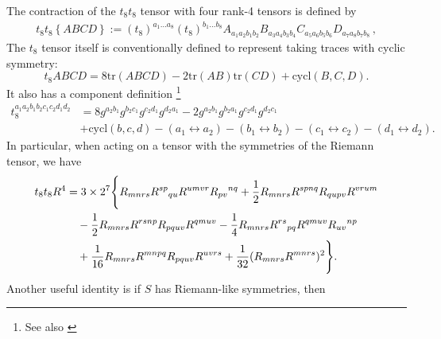 The contraction of the $t_8 t_8$ tensor with four rank-4 tensors is defined by
\begin{align}
	t_8 t_8 \left\{ ABCD \right\} := (t_8)^{a_1 \ldots a_8} (t_8)^{b_1 \ldots b_8} A_{a_1 a_2 b_1 b_2} B_{a_3 a_4 b_3 b_4} C_{a_5 a_6 b_5 b_6} D_{a_7 a_8 b_7 b_8} \,,
\end{align}
The $t_8$ tensor itself is conventionally \cite{Aggarwal:2025lxf,Liu:2025uqu} defined to represent taking traces with cyclic symmetry:
\begin{equation}
t_8 ABCD = 8 \text{tr} (ABCD) - 2 \text{tr} (AB) \text{tr} (CD) + \text{cycl}(B,C,D).
\end{equation}
It also has a component definition \footnote{See also \cite{Minasian:2015bxa}}
\begin{equation}
\begin{aligned}
t_8^{a_1 a_2 b_1 b_2 c_1 c_2 d_1 d_2}
&= 8 g^{a_2 b_1} g^{b_2 c_1} g^{c_2 d_1} g^{d_2 a_1}
- 2 g^{a_2 b_1} g^{b_2 a_1} g^{c_2 d_1} g^{d_2 c_1}\\
&+ \text{cycl}(b,c,d)
- (a_1 \leftrightarrow a_2)
- (b_1 \leftrightarrow b_2)
- (c_1 \leftrightarrow c_2)
- (d_1 \leftrightarrow d_2).
\end{aligned}
\end{equation}
In particular, when acting on a tensor with the symmetries of the Riemann tensor, we have
\begin{equation}
\begin{aligned}
t_8 t_8 R^4 &= 3 \times 2^7 \Biggl\{
R_{mnrs} R^{sp}{}_{qu} R^{umvr} R_{pv}{}^{nq}
+ \frac{1}{2} R_{mnrs} R^{spnq} R_{qupv} R^{vrum} \notag \\
&\quad - \frac{1}{2} R_{mnrs} R^{rsnp} R_{pquv} R^{qmuv}
- \frac{1}{4} R_{mnrs} R^{rs}{}_{pq} R^{qmuv} R_{uv}{}^{np} \notag \\
&\quad + \frac{1}{16} R_{mnrs} R^{mnpq} R_{pquv} R^{uvrs}
+ \frac{1}{32} (R_{mnrs} R^{mnrs})^2
\Biggr\}. \label{eq:A2}
\end{aligned}
\end{equation}
Another useful identity is if $S$ has Riemann-like symmetries, then
